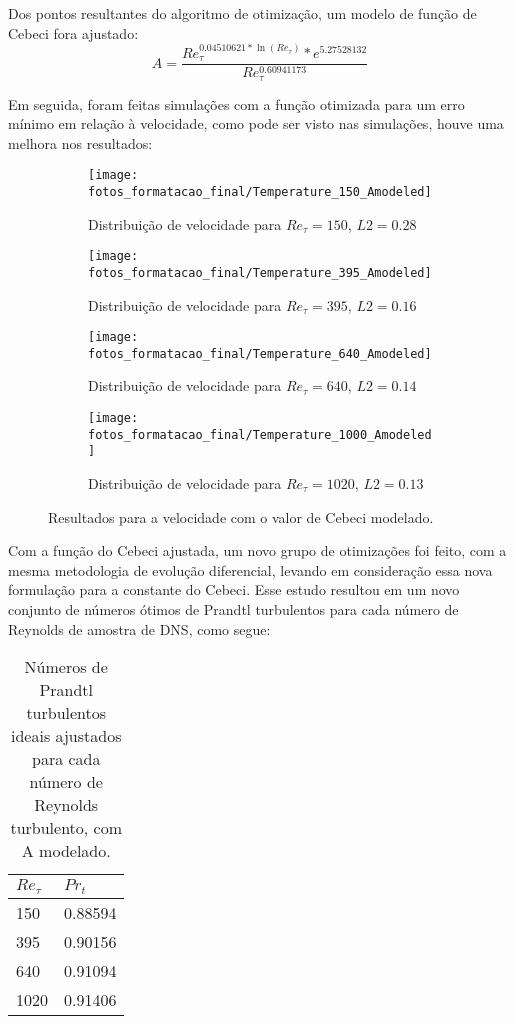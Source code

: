 Dos pontos resultantes do algoritmo de otimização, um modelo de função de Cebeci fora ajustado:
\begin{equation}
A = \frac{Re_\tau ^{0.04510621 * \ln(Re_\tau)} *e ^ {5.27528132} }{Re_\tau ^{0.60941173}}
\end{equation}

Em seguida, foram feitas simulações com a função otimizada para um erro mínimo em relação à velocidade, como pode ser visto nas simulações, houve uma melhora nos resultados:


\begin{figure*}[!h]
	\centering
	\begin{subfigure}[t]{0.5\textwidth}
		\centering
		\texttt{[image: fotos\_formatacao\_final/Temperature\_150\_Amodeled]}
		\caption{Distribuição de velocidade para $Re_\tau = 150$, $L2 = 0.28$}
	\end{subfigure}
	\begin{subfigure}[t]{0.45\textwidth}
		\centering
		\texttt{[image: fotos\_formatacao\_final/Temperature\_395\_Amodeled]}
		\caption{Distribuição de velocidade para $Re_\tau = 395$, $L2 = 0.16$}
	\end{subfigure}
	\begin{subfigure}[t]{0.5\textwidth}
		\centering
		\texttt{[image: fotos\_formatacao\_final/Temperature\_640\_Amodeled]}
		\caption{Distribuição de velocidade para $Re_\tau = 640$, $L2 = 0.14$}
	\end{subfigure}
	\begin{subfigure}[t]{0.45\textwidth}
		\centering
		\texttt{[image: fotos\_formatacao\_final/Temperature\_1000\_Amodeled]}
		\caption{Distribuição de velocidade para $Re_\tau = 1020$, $L2 = 0.13$}
	\end{subfigure}	
	\caption{Resultados para a velocidade com o valor de Cebeci modelado.}
\end{figure*}

Com a função do Cebeci ajustada, um novo grupo de otimizações foi feito, com a mesma metodologia de evolução diferencial, levando em consideração essa nova formulação para a constante do Cebeci. Esse estudo resultou em um novo conjunto de números ótimos de Prandtl turbulentos para cada número de Reynolds de amostra de DNS, como segue:


\begin{table}[!h]
	\centering
	\caption{Números de Prandtl turbulentos ideais ajustados para cada número de Reynolds turbulento, com A modelado.}
	\begin{tabular}{ll}
		\hline
		$Re_\tau$ & $Pr_t$\\
		\hline
		150  &   0.88594\\
		395  &   0.90156\\
		640  &   0.91094\\
		1020 &   0.91406\\ 
		\hline
	\end{tabular}
\end{table}

